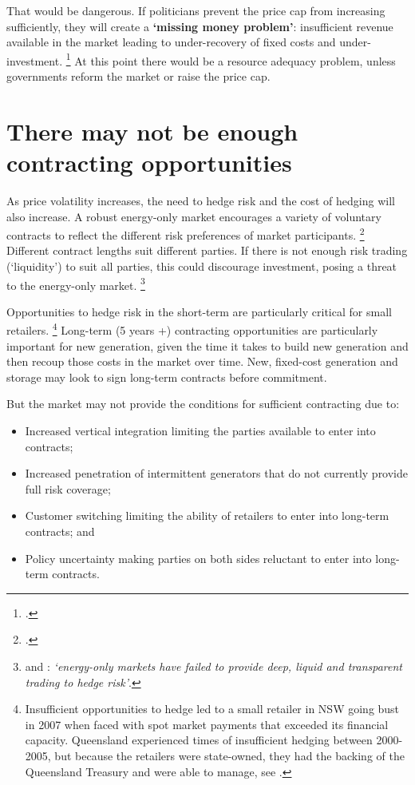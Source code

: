 \documentclass[FrontPage]{grattan}
\begin{document}
That would be dangerous. If politicians prevent the price cap from increasing sufficiently, they will create a \textbf{`missing money problem'}: insufficient revenue available in the market leading to under-recovery of fixed costs and under-investment.%
\footcites{Joskow2006CompetitiveElectricityMarkets}{Joskow2008CapacityPayments}
At this point there would be a resource adequacy problem, unless governments reform the market or raise the price cap.

\section{There may not be enough contracting opportunities}\label{sec:are-contracting-opportunities-sufficient}
As price volatility increases, the need to hedge risk and the cost of hedging will also increase. A robust energy-only market encourages a variety of voluntary contracts to reflect the different risk preferences of market participants.%
\footcites[][8]{hogan2005energy}[][3]{Yarrow2014Bidding}
Different contract lengths suit different parties. If there is not enough risk trading (`liquidity') to suit all parties, this could discourage investment, posing a threat to the energy-only market.%
\footnote{\eg{} \textcite{Gauthier2017TheNeedForLongtermContracts} and \textcite[][224]{helm2017burnout}: \emph{`energy-only markets have failed to provide deep, liquid and transparent trading to hedge risk'}.}

Opportunities to hedge risk in the short-term are particularly critical for small retailers.%
\footnote{Insufficient opportunities to hedge led to a small retailer in NSW going bust in 2007 when faced with spot market payments that exceeded its financial capacity. Queensland experienced times of insufficient hedging between 2000-2005, but because the retailers were state-owned, they had the backing of the Queensland Treasury and were able to manage, see \textcite[][14]{Simshauser2010EntryCostShock}.}
Long-term (5 years +) contracting opportunities are particularly important for new generation, given the time it takes to build new generation and then recoup those costs in the market over time. New, fixed-cost generation and storage may look to sign long-term contracts before commitment.

But the market may not provide the conditions for sufficient contracting due to:
\begin{itemize}
    \item Increased vertical integration limiting the parties available to enter into contracts; 
    \item Increased penetration of intermittent generators that do not currently provide full risk coverage;
    \item Customer switching limiting the ability of retailers to enter into long-term contracts; and
    \item Policy uncertainty making parties on both sides reluctant to enter into long-term contracts.
\end{itemize}
\end{document}
